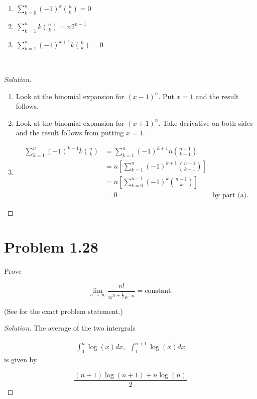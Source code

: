 \documentclass[12pt,letterpaper,reqno]{amsart}
\numberwithin{equation}{subsection}
\begin{document}
\begin{enumerate}[label=(\alph*),leftmargin=*]
    \item $\sum_{k=0}^n (-1)^k \binom{n}{k} = 0$
    \item $\sum_{k=1}^n k \binom{n}{k} = n2^{n-1}$
    \item $\sum_{k=1}^n (-1)^{k+1} k \binom{n}{k} = 0$
\end{enumerate}~\\

\begin{proof}[Solution]~\\
\begin{enumerate}[label=(\alph*),leftmargin=*]
    \item Look at the binomial expansion for $(x-1)^n$. Put $x = 1$ and the result follows.
    
    \item Look at the binomial expansion for $(x+1)^n$. Take derivative on both sides and the result follows from putting $x = 1$.
    
    \item 
    
    \begin{align*}
        \sum_{k=1}^{n} (-1)^{k+1} k \binom{n}{k} &= \sum_{k=1}^n (-1)^{k+1} n \binom{n-1}{k-1} \\
        &= n \left[ \sum_{k=1}^n (-1)^{k+1} \binom{n-1}{k-1} \right] \\
        &= n \left[ \sum_{k=0}^{n-1} (-1)^k \binom{n-1}{k} \right] \\
        &= 0 & \mbox{by part (a)}.
    \end{align*}
\end{enumerate}
\end{proof}

\newpage
\section{Problem 1.28}

Prove

\[ \lim_{n \rightarrow \infty} \frac{n!}{n^{n+ \frac{1}{2}} e^{-n}} = \mbox{constant}. \]

(See \cite[page 40]{Berger-Casella} for the exact problem statement.)

\begin{proof}[Solution]
The average of the two intergrals

\begin{align*}
 \int_0^n \log(x) dx, \ \ \int_1^{n+1} \log(x) dx
\end{align*}
is given by

\[ \frac{(n+1)\log(n+1) + n \log(n)}{2} \]
\end{proof}

\newpage
\nocite{*}
\printbibliography
\end{document}
